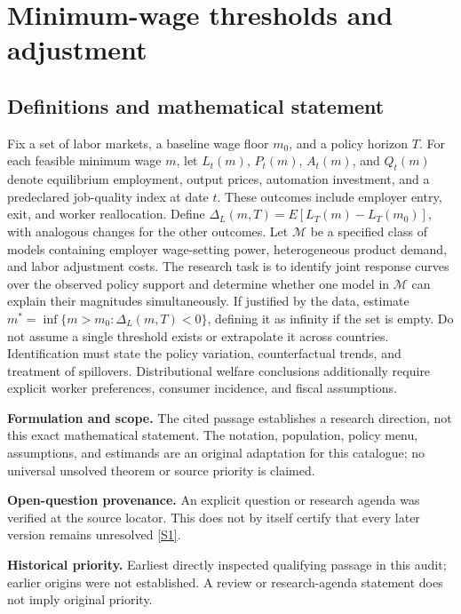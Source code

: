 \documentclass[11pt]{article}
\newcommand{\sref}[2]{\hyperlink{source:#1:#2}{[S#2]}}
\begin{document}
\section*{Minimum-wage thresholds and adjustment}\label{30007633}
\subsection{Definitions and mathematical statement}
Fix a set of labor markets, a baseline wage floor \(m_0\), and a policy horizon \(T\). For each feasible minimum wage \(m\), let \(L_t(m)\), \(P_t(m)\), \(A_t(m)\), and \(Q_t(m)\) denote equilibrium employment, output prices, automation investment, and a predeclared job-quality index at date \(t\). These outcomes include employer entry, exit, and worker reallocation. Define \(\Delta_L(m,T)=E[L_T(m)-L_T(m_0)]\), with analogous changes for the other outcomes. Let \(\mathcal M\) be a specified class of models containing employer wage-setting power, heterogeneous product demand, and labor adjustment costs. The research task is to identify joint response curves over the observed policy support and determine whether one model in \(\mathcal M\) can explain their magnitudes simultaneously. If justified by the data, estimate \(m^*=\inf\{m>m_0:\Delta_L(m,T)<0\}\), defining it as infinity if the set is empty. Do not assume a single threshold exists or extrapolate it across countries. Identification must state the policy variation, counterfactual trends, and treatment of spillovers. Distributional welfare conclusions additionally require explicit worker preferences, consumer incidence, and fiscal assumptions.

\par\textbf{Formulation and scope.} The cited passage establishes a research direction, not this exact mathematical statement. The notation, population, policy menu, assumptions, and estimands are an original adaptation for this catalogue; no universal unsolved theorem or source priority is claimed.

\par\textbf{Open-question provenance.} An explicit question or research agenda was verified at the source locator. This does not by itself certify that every later version remains unresolved \sref{30007633}{1}.

\par\textbf{Historical priority.} Earliest directly inspected qualifying passage in this audit; earlier origins were not established. A review or research-agenda statement does not imply original priority.
\end{document}
